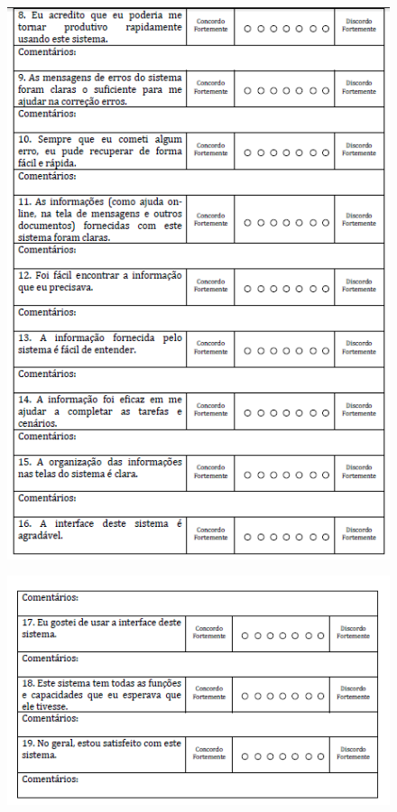 \graphicspath{{figuras/}}
\begin{figure}[H]
\centering
\includegraphics[width=1.0\textwidth]{PSSUQ2}
\label{pssuq2}
\end{figure}

\graphicspath{{figuras/}}
\begin{figure}[H]
\centering
\includegraphics[width=1.0\textwidth]{PSSUQ3}
\label{pssuq3}
\end{figure}

